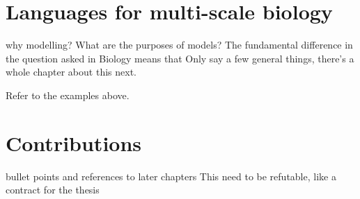 \documentclass[phd]{infthesis}
\begin{document}

\section{Languages for multi-scale biology}
why modelling? What are the purposes of models?
The fundamental difference in the question asked in Biology means that 
Only say a few general things, there's a whole chapter about this next.

Refer to the examples above.

\section{Contributions}
bullet points and references to later chapters
This need to be refutable, like a contract for the thesis

\printbibliography[heading=bibintoc]
\end{document}
